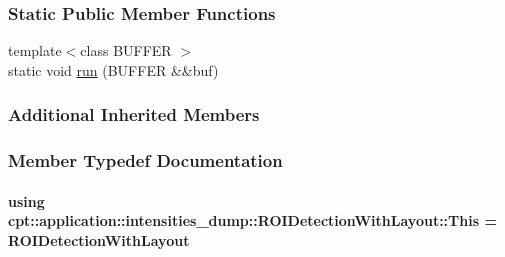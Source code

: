 \subsubsection*{Static Public Member Functions}
\begin{DoxyCompactItemize}
\item 
{\footnotesize template$<$class B\-U\-F\-F\-E\-R $>$ }\\static void \hyperlink{structcpt_1_1application_1_1intensities__dump_1_1_r_o_i_detection_with_layout_a947191874e255c8433c66b0f5d352646}{run} (B\-U\-F\-F\-E\-R \&\&buf)
\end{DoxyCompactItemize}
\subsubsection*{Additional Inherited Members}


\subsubsection{Member Typedef Documentation}
\hypertarget{structcpt_1_1application_1_1intensities__dump_1_1_r_o_i_detection_with_layout_a3ef4ded751300a297b16fc2e44a67e4e}{
\paragraph[{This}]{\setlength{\rightskip}{0pt plus 5cm}using {\bf cpt\-::application\-::intensities\-\_\-dump\-::\-R\-O\-I\-Detection\-With\-Layout\-::\-This} =  {\bf R\-O\-I\-Detection\-With\-Layout}}}\label{structcpt_1_1application_1_1intensities__dump_1_1_r_o_i_detection_with_layout_a3ef4ded751300a297b16fc2e44a67e4e}


